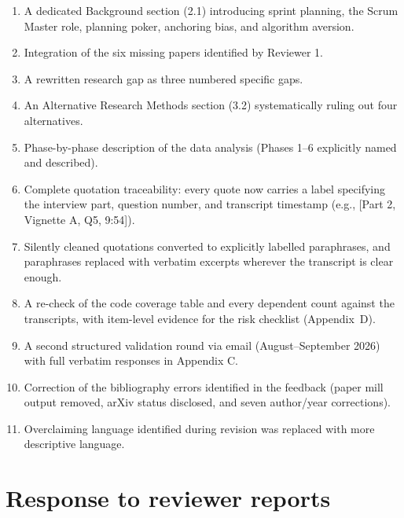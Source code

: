 \documentclass[12pt,a4paper,twoside]{article}
\begin{document}
\begin{enumerate}
  \item A dedicated Background section (2.1) introducing sprint planning, the Scrum
        Master role, planning poker, anchoring bias, and algorithm aversion.
  \item Integration of the six missing papers identified by Reviewer 1.
  \item A rewritten research gap as three numbered specific gaps.
  \item An Alternative Research Methods section (3.2) systematically ruling out
        four alternatives.
  \item Phase-by-phase description of the data analysis (Phases 1--6 explicitly
        named and described).
  \item Complete quotation traceability: every quote now carries a label specifying
        the interview part, question number, and transcript timestamp (e.g., [Part 2,
        Vignette A, Q5, 9:54]).
  \item Silently cleaned quotations converted to explicitly labelled paraphrases, and paraphrases replaced with verbatim excerpts wherever the transcript is clear enough.
  \item A re-check of the code coverage table and every dependent count against the transcripts, with item-level evidence for the risk checklist (Appendix~D).
  \item A second structured validation round via email (August--September 2026) with
        full verbatim responses in Appendix C.
  \item Correction of the bibliography errors identified in the feedback (paper mill
        output removed, arXiv status disclosed, and seven author/year corrections).
  \item Overclaiming language identified during revision was replaced with more
        descriptive language.
\end{enumerate}

\section{Response to reviewer reports}
\end{document}
